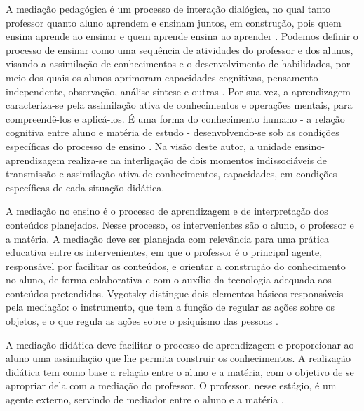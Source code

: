 A mediação pedagógica é um processo de interação dialógica, no qual
tanto professor quanto aluno aprendem e ensinam juntos, em construção,
pois quem ensina aprende ao ensinar e quem aprende ensina ao aprender
\cite{mori2013}. Podemos definir o processo de ensinar como uma sequência
de atividades do professor e dos alunos, visando a assimilação de
conhecimentos e o desenvolvimento de habilidades, por meio dos quais os
alunos aprimoram capacidades cognitivas, pensamento independente,
observação, análise-síntese e outras \cite[p. 54]{libaneo2013}. Por sua
vez, a aprendizagem caracteriza-se pela assimilação ativa de
conhecimentos e operações mentais, para compreendê-los e aplicá-los. É
uma forma do conhecimento humano - a relação cognitiva entre aluno e
matéria de estudo - desenvolvendo-se sob as condições específicas do
processo de ensino \cite{libaneo2013}. Na visão deste autor, a unidade
ensino-aprendizagem realiza-se na interligação de dois momentos
indissociáveis de transmissão e assimilação ativa de conhecimentos,
capacidades, em condições específicas de cada situação didática.

A mediação no ensino é o processo de aprendizagem e de interpretação dos
conteúdos planejados. Nesse processo, os intervenientes são o aluno, o
professor e a matéria. A mediação deve ser planejada com relevância para
uma prática educativa entre os intervenientes, em que o professor é o
principal agente, responsável por facilitar os conteúdos, e orientar a
construção do conhecimento no aluno, de forma colaborativa e com o
auxílio da tecnologia adequada aos conteúdos pretendidos. Vygotsky
distingue dois elementos básicos responsáveis pela mediação: o
instrumento, que tem a função de regular as ações sobre os objetos, e o
que regula as ações sobre o psiquismo das pessoas \cite[p. 50]{rego1995}.

A mediação didática deve facilitar o processo de aprendizagem e
proporcionar ao aluno uma assimilação que lhe permita construir os
conhecimentos. A realização didática tem como base a relação entre o
aluno e a matéria, com o objetivo de se apropriar dela com a mediação do
professor. O professor, nesse estágio, é um agente externo, servindo de
mediador entre o aluno e a matéria \cite{vygotskii1988}.





